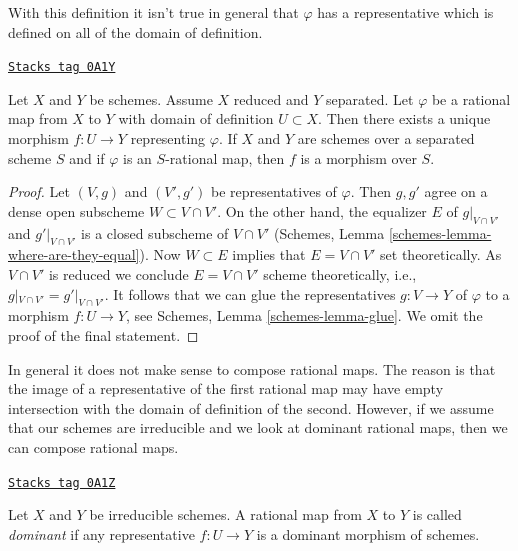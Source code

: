 With this definition it isn't true in general that $\varphi$ has a
representative which is defined on all of the domain of definition.

\begin{lemma}
\label{morphisms-lemma-rational-map-from-reduced-to-separated}
\href{https://stacks.math.columbia.edu/tag/0A1Y}{\texttt{Stacks tag 0A1Y}}

Let $X$ and $Y$ be schemes. Assume $X$ reduced and $Y$ separated. Let
$\varphi$ be a rational map from $X$ to $Y$ with domain of definition
$U \subset X$. Then there exists a unique morphism $f : U \to Y$
representing $\varphi$. If $X$ and $Y$ are schemes over a separated
scheme $S$ and if $\varphi$ is an $S$-rational map, then $f$ is a
morphism over $S$.
\end{lemma}

\begin{proof}
Let $(V, g)$ and $(V', g')$ be representatives of $\varphi$. Then
$g, g'$ agree on a dense open subscheme $W \subset V \cap V'$.
On the other hand, the equalizer $E$ of $g|_{V \cap V'}$ and $g'|_{V \cap V'}$
is a closed subscheme of $V \cap V'$ (Schemes, Lemma
\ref{schemes-lemma-where-are-they-equal}). Now $W \subset E$
implies that $E = V \cap V'$ set theoretically. As $V \cap V'$
is reduced we conclude $E = V \cap V'$ scheme theoretically, i.e.,
$g|_{V \cap V'} = g'|_{V \cap V'}$. It follows that we can glue the
representatives $g : V \to Y$ of $\varphi$ to a morphism $f : U \to Y$, see
Schemes, Lemma \ref{schemes-lemma-glue}.
We omit the proof of the final statement.
\end{proof}

In general it does not make sense to compose rational maps. The reason
is that the image of a representative of the first rational map may
have empty intersection with the domain of definition of the second.
However, if we assume that our schemes are irreducible and we look
at dominant rational maps, then we can compose rational maps.

\begin{definition}
\label{morphisms-definition-dominant-rational}
\href{https://stacks.math.columbia.edu/tag/0A1Z}{\texttt{Stacks tag 0A1Z}}

Let $X$ and $Y$ be irreducible schemes. A rational map from $X$ to $Y$
is called {\it dominant} if any representative $f : U \to Y$ is a dominant
morphism of schemes.
\end{definition}

